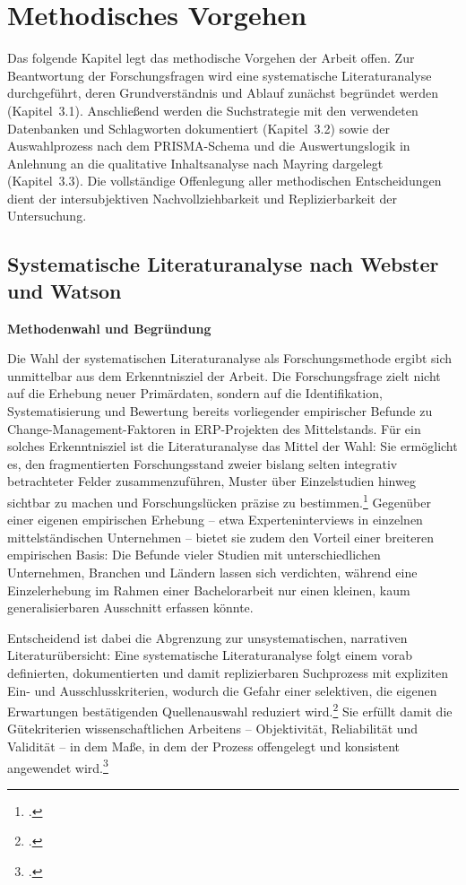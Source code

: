 \section{Methodisches Vorgehen}

Das folgende Kapitel legt das methodische Vorgehen der Arbeit offen. Zur Beantwortung der Forschungsfragen wird eine systematische Literaturanalyse durchgef\"uhrt, deren Grundverst\"andnis und Ablauf zun\"achst begr\"undet werden (Kapitel~3.1). Anschlie\ss{}end werden die Suchstrategie mit den verwendeten Datenbanken und Schlagworten dokumentiert (Kapitel~3.2) sowie der Auswahlprozess nach dem PRISMA-Schema und die Auswertungslogik in Anlehnung an die qualitative Inhaltsanalyse nach Mayring dargelegt (Kapitel~3.3). Die vollst\"andige Offenlegung aller methodischen Entscheidungen dient der intersubjektiven Nachvollziehbarkeit und Replizierbarkeit der Untersuchung.

\subsection{Systematische Literaturanalyse nach Webster und Watson}

\textbf{Methodenwahl und Begr\"undung}

Die Wahl der systematischen Literaturanalyse als Forschungsmethode ergibt sich unmittelbar aus dem Erkenntnisziel der Arbeit. Die Forschungsfrage zielt nicht auf die Erhebung neuer Prim\"ardaten, sondern auf die Identifikation, Systematisierung und Bewertung bereits vorliegender empirischer Befunde zu Change-Management-Faktoren in ERP-Projekten des Mittelstands. F\"ur ein solches Erkenntnisziel ist die Literaturanalyse das Mittel der Wahl: Sie erm\"oglicht es, den fragmentierten Forschungsstand zweier bislang selten integrativ betrachteter Felder zusammenzuf\"uhren, Muster \"uber Einzelstudien hinweg sichtbar zu machen und Forschungsl\"ucken pr\"azise zu bestimmen.\footcite[Vgl.][S.~xiii--xiv]{webster2002} Gegen\"uber einer eigenen empirischen Erhebung -- etwa Experteninterviews in einzelnen mittelst\"andischen Unternehmen -- bietet sie zudem den Vorteil einer breiteren empirischen Basis: Die Befunde vieler Studien mit unterschiedlichen Unternehmen, Branchen und L\"andern lassen sich verdichten, w\"ahrend eine Einzelerhebung im Rahmen einer Bachelorarbeit nur einen kleinen, kaum generalisierbaren Ausschnitt erfassen k\"onnte.

Entscheidend ist dabei die Abgrenzung zur unsystematischen, narrativen Literatur\"ubersicht: Eine systematische Literaturanalyse folgt einem vorab definierten, dokumentierten und damit replizierbaren Suchprozess mit expliziten Ein- und Ausschlusskriterien, wodurch die Gefahr einer selektiven, die eigenen Erwartungen best\"atigenden Quellenauswahl reduziert wird.\footcite[Vgl.][S.~xv--xvi]{webster2002} Sie erf\"ullt damit die G\"utekriterien wissenschaftlichen Arbeitens -- Objektivit\"at, Reliabilit\"at und Validit\"at -- in dem Ma\ss{}e, in dem der Prozess offengelegt und konsistent angewendet wird.\footcite[Vgl.][S.~2--4]{vombrocke2009}

